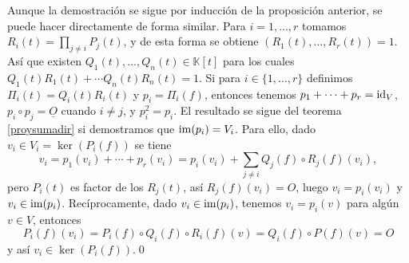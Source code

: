 \dem Aunque la demostración se sigue por inducción de la proposición anterior, se puede hacer directamente de forma similar. Para $i=1,\ldots,r$ tomamos $R_i(t)=\prod_{j\ne i}P_j(t)$, y de esta forma se obtiene $(R_1(t),\ldots,R_r(t))=1$. Así que existen $Q_1(t),\ldots, Q_n(t)\in \mathbb{K}[t]$ para los cuales $Q_1(t)R_1(t)+\cdots Q_n(t)R_n(t)=1$. Si para $i\in\{1,\ldots,r\}$ definimos $\Pi_i(t)=Q_i(t)R_i(t)$ y $p_i=\Pi_i(f)$, entonces tenemos $p_1+\cdots+p_r=\operatorname{id}_V$,
$p_i\circ p_j=\underline{O}$ cuando $i\ne j$, y $p_i^2=p_i$. El resultado se sigue del teorema \ref{proysumadir} si demostramos que $\operatorname{im}(p_i)=V_i$. Para ello, dado $v_i\in V_i=\ker(P_i(f))$ se tiene
$$v_i=p_1(v_i)+\cdots+p_r(v_i)=p_i(v_i)+\sum_{j\ne i} Q_j(f)\circ R_j(f)(v_i),$$
pero $P_i(t)$ es factor de los $R_j(t)$, así $R_j(f)(v_i)=O$, luego $v_i=p_i(v_i)$ y $v_i\in\operatorname{im}(p_i)$. Recíprocamente, dado $v_i\in\operatorname{im}(p_i)$, tenemos $v_i=p_i(v)$ para algún $v\in V$, entonces 
$$P_i(f)(v_i)=P_i(f)\circ Q_i(f)\circ R_i(f)(v)=Q_i(f)\circ P(f)(v)=O$$
y así $v_i\in\ker(P_i(f))$.\qed

